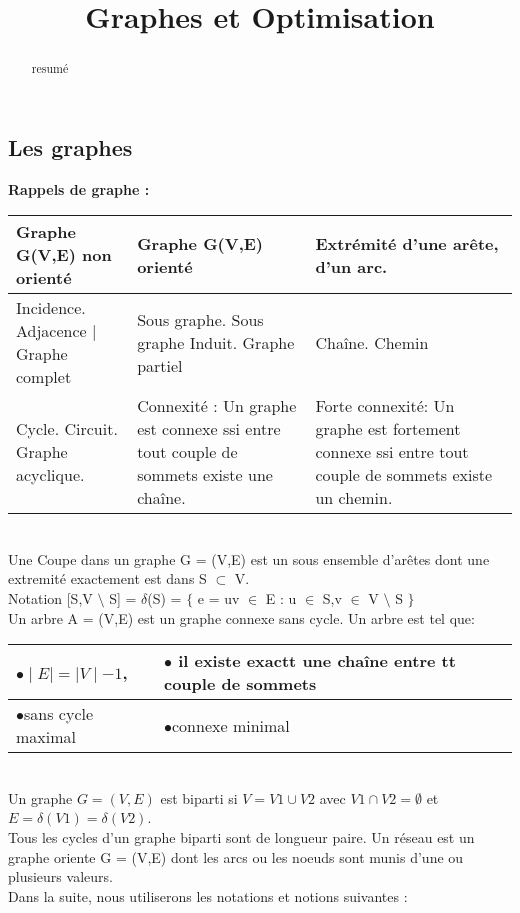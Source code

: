 \documentclass[5pt]{article}
\newcommand\tab[1][1cm]{\hspace*{#1}}
\begin{document}
\begin{scriptsize}
\title{Graphes et Optimisation}
\date{}
\begin{abstract}
resumé
\end{abstract}
\subsection{Les graphes}
\textbf{Rappels de graphe :}  \\
\noindent
\begin{tabularx}{\linewidth}{|Y|Y|Y|}
\hline
Graphe G(V,E) non orienté &
Graphe G(V,E) orienté &
Extrémité d'une arête, d'un arc.\\ \hline
Incidence. Adjacence $\vert$ Graphe complet &
Sous graphe. Sous graphe Induit. Graphe partiel &
Chaîne. Chemin \\ \hline
Cycle. Circuit. Graphe acyclique. &
Connexité : Un graphe est connexe ssi entre tout couple de sommets existe une chaîne. &
Forte connexité: Un graphe est fortement connexe ssi entre tout couple de sommets existe un chemin. \\ \hline
\end{tabularx} 
\\
Une Coupe dans un graphe G = (V,E) est un sous ensemble d'arêtes dont une extremité exactement est dans S $\subset$ V. \\
\tab Notation [S,V $\setminus$ S] = $\delta$(S) = $\lbrace$ e = uv $\in$ E : u $\in$ S,v $\in$ V $\setminus$ S $\rbrace$ \\Un arbre A = (V,E) est un graphe connexe sans cycle. Un arbre est tel que: \\
\noindent
\begin{tabularx}{\linewidth}{|Y|Y|}
\hline
\tab$\bullet \mid E\mid = \mid V\mid -1$, &
\tab$\bullet$ il existe exactt une chaîne entre tt couple de sommets\\\hline
\tab$\bullet$sans cycle maximal &
\tab$\bullet$connexe minimal \\ \hline
\end{tabularx}
\\
Un graphe $G = (V,E)$ est biparti si $V = V 1 \cup V 2 $ avec $ V 1 \cap V 2 = \emptyset $ et $ E = \delta(V1) = \delta(V2)$.\\Tous les cycles d'un graphe biparti sont de longueur paire. Un réseau est un graphe oriente G = (V,E) dont les arcs ou les noeuds sont munis d'une ou plusieurs valeurs. \\Dans la suite, nous utiliserons les notations et notions suivantes : \\

\end{scriptsize}
\end{document}
